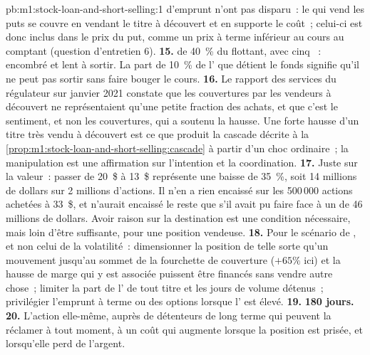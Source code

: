 \begin{solution}{pb:m1:stock-loan-and-short-selling:1}
{d'emprunt} n'ont pas disparu~: le  qui vend les puts se couvre en
vendant le titre à découvert et en supporte le coût~; celui-ci est donc inclus dans le prix du put, comme un prix à terme
inférieur au cours au comptant (question d'entretien 6).
\textbf{15.}  de 40~\% du flottant, avec cinq ~:
encombré et lent à sortir. La part de 10~\% de l' que détient le fonds
signifie qu'il ne peut pas sortir sans faire bouger le cours.
\textbf{16.} Le rapport des services du régulateur sur janvier 2021 constate que les couvertures par les vendeurs à
découvert ne représentaient qu'une petite fraction des achats, et que c'est le sentiment, et non les couvertures,
qui a soutenu la hausse. Une forte hausse d'un titre très vendu à découvert est ce que produit la
cascade décrite à la \cref{prop:m1:stock-loan-and-short-selling:cascade} à partir
d'un choc ordinaire~; la manipulation est une affirmation sur l'intention et la coordination.
\textbf{17.} Juste sur la valeur~: passer de 20~\$ à 13~\$ représente une baisse de 35~\%, soit 14
millions de dollars sur 2 millions d'actions. Il n'en a rien encaissé sur les 500\,000 actions
achetées à 33~\$, et n'aurait encaissé le reste que s'il avait pu faire face à un
 de 46 millions de dollars. Avoir raison sur la destination est une
condition nécessaire, mais loin d'être suffisante, pour une position vendeuse.
\textbf{18.} Pour le scénario de , et non celui de la volatilité~: dimensionner la position de telle sorte qu'un
mouvement jusqu'au sommet de la fourchette de couverture ($+65\%$ ici) et la hausse de marge qui y est associée
puissent être financés sans vendre autre chose~; limiter la part
de l' de tout titre et les jours de volume détenus~; privilégier l'emprunt à terme
ou des options lorsque l' est élevé.
\textbf{19.} \textbf{180 jours.}
\textbf{20.} L'action elle-même, auprès de détenteurs de long terme qui peuvent la réclamer
à tout moment, à un coût qui augmente lorsque la position est prisée, et lorsqu'elle perd
de l'argent.
\end{solution}

